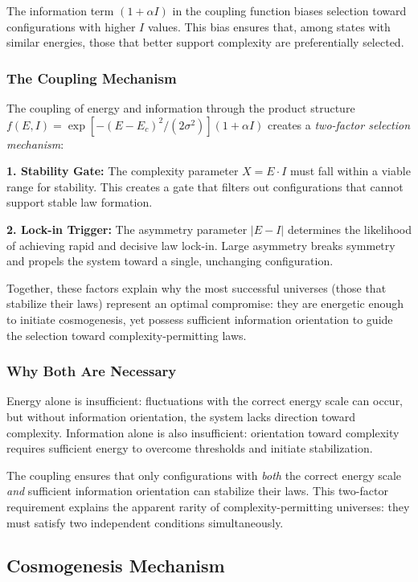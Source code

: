 \documentclass[12pt,a4paper]{article}
\theoremstyle{definition}
\theoremstyle{remark}
\begin{document}
The information term $(1 + \alpha I)$ in the coupling function biases selection toward configurations with higher $I$ values. This bias ensures that, among states with similar energies, those that better support complexity are preferentially selected.

\subsubsection{The Coupling Mechanism}

The coupling of energy and information through the product structure $f(E,I) = \exp[-(E - E_c)^2/(2\sigma^2)] (1 + \alpha I)$ creates a \emph{two-factor selection mechanism}:

\textbf{1. Stability Gate:} The complexity parameter $X = E \cdot I$ must fall within a viable range for stability. This creates a gate that filters out configurations that cannot support stable law formation.

\textbf{2. Lock-in Trigger:} The asymmetry parameter $|E - I|$ determines the likelihood of achieving rapid and decisive law lock-in. Large asymmetry breaks symmetry and propels the system toward a single, unchanging configuration.

Together, these factors explain why the most successful universes (those that stabilize their laws) represent an optimal compromise: they are energetic enough to initiate cosmogenesis, yet possess sufficient information orientation to guide the selection toward complexity-permitting laws.

\subsubsection{Why Both Are Necessary}

Energy alone is insufficient: fluctuations with the correct energy scale can occur, but without information orientation, the system lacks direction toward complexity. Information alone is also insufficient: orientation toward complexity requires sufficient energy to overcome thresholds and initiate stabilization.

The coupling ensures that only configurations with \emph{both} the correct energy scale \emph{and} sufficient information orientation can stabilize their laws. This two-factor requirement explains the apparent rarity of complexity-permitting universes: they must satisfy two independent conditions simultaneously.

\subsection{Cosmogenesis Mechanism}
\end{document}
